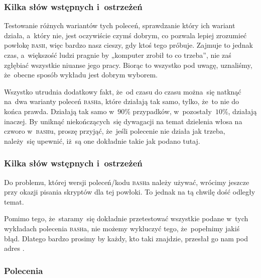 \documentclass[10pt,t]{beamer}
\begin{document}
\begin{frame}
  \frametitle{Kilka słów wstępnych i~ostrzeżeń}


  Testowanie różnych wariantów tych poleceń, sprawdzanie który ich wariant
  działa, a~który nie, jest oczywiście czymś dobrym, co pozwala lepiej
  zrozumieć powłokę \textsc{bash}, więc bardzo nasz cieszy, gdy ktoś tego
  próbuje. Zajmuje to jednak czas, a~większość ludzi pragnie by „komputer
  zrobił to co trzeba”, nie zaś zgłębiać wszystkie niuanse jego pracy.
  Biorąc to wszystko pod uwagę, uznaliśmy, że~obecne sposób wykładu jest
  dobrym wyborem.

  Wszystko utrudnia dodatkowy fakt, że~od czasu do czasu można~się natknąć
  na~dwa warianty poleceń \textsc{bash}a, które działają tak samo, tylko,
  że~to nie do końca prawda. Działają tak samo w~$90\%$ przypadków,
  w~pozostały~$10\%$, działają inaczej. By uniknąć niekończących~się
  dywagacji na temat dzielenia włosa na czworo w~\textsc{bash}u, proszę
  przyjąć, że~jeśli polecenie nie działa jak trzeba, należy~się upewnić,
  iż~są one \alert{dokładnie} takie jak podano tutaj.

\end{frame}





\begin{frame}
  \frametitle{Kilka słów wstępnych i~ostrzeżeń}


  Do problemu, której wersji poleceń/kodu \textsc{bash}a należy używać,
  wrócimy jeszcze przy okazji pisania skryptów dla tej powłoki. To jednak
  na tą chwilę dość odległy temat.

  Pomimo tego, że~staramy~się dokładnie przetestować wszystkie podane
  w~tych wykładach polecenia \textsc{bash}a, nie możemy wykluczyć tego,
  że~popełnimy jakiś błąd. Dlatego bardzo prosimy by każdy, kto taki
  znajdzie, przesłał go nam pod adres \email.

\end{frame}










\begin{frame}
  \frametitle{Polecenia}




\end{frame}
\end{document}
